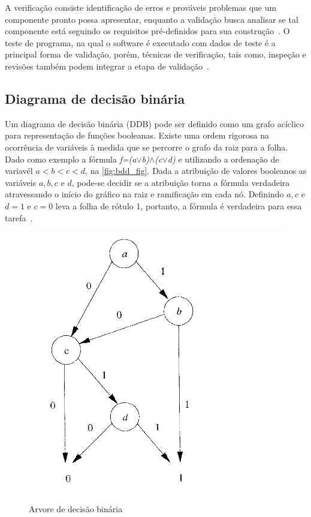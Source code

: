\par
A verificação consiste identificação de erros e prováveis problemas que um componente pronto possa apresentar, enquanto a validação busca analisar se tal componente está seguindo os requisitos pré-definidos para sua construção~\cite{koscianski2007qualidade}. O teste de programa, na qual o software  é executado com dados de teste é a principal forma de validação, porém, técnicas de verificação, tais como, inspeção e revisões também podem integrar a etapa de validação~\cite{sommerville2011engenharia}.

\subsection{Diagrama de decisão binária}
Um diagrama de decisão binária (DDB) pode ser definido como um grafo acíclico para representação de funções booleanas. Existe uma ordem rigorosa na ocorrência de variáveis à medida que se percorre o grafo da raiz para a folha. Dado como exemplo a fórmula \textit{f=(a$\lor$b)$\land$(c$\lor$d)} e utilizando a ordenação de variavél $a < b < c < d$, na \autoref{fig:bdd_fig}. Dada a atribuição de valores booleanos as variáveis $a, b, c$ e $d$, pode-se decidir se a atribuição torna a fórmula verdadeira atravessando o início do gráfico na raiz e ramificação em cada nó. Definindo $a,c$ e $d = 1$ e $c = 0$ leva a folha de rótulo 1, portanto, a fórmula é verdadeira para essa tarefa~\cite{clarke1994model}.


\begin{figure}[H]
	\begin{center}
    \caption{\label{fig:bdd_fig}Arvore de decisão binária}
	\includegraphics[scale=0.30]{Figuras/Arvore_BDD.png}
	\end{center}
\end{figure}

